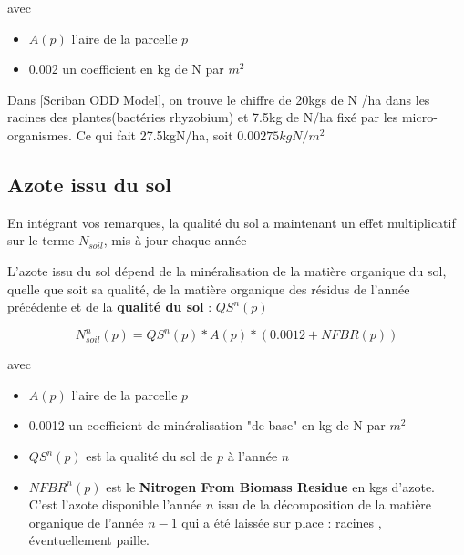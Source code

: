 \documentclass[10pt,a4paper,french]{article} %
\begin{document}
avec 
\begin{itemize}
  \item $A(p)$ l'aire de la parcelle $p$
  \item 0.002  un coefficient en kg de N par $m^2$
\end{itemize}

Dans [Scriban ODD Model], on trouve le chiffre de 20kgs de N /ha dans les racines des plantes(bactéries rhyzobium) et 7.5kg de N/ha  fixé par les micro-organismes. Ce qui fait 27.5kgN/ha, soit $0.00275 kgN/m^2$ 


\subsection{Azote issu du sol}






\begin{tcolorbox}[noparskip,
    colback=Orange,colframe=SandyBrown,%
    colbacklower=LimeGreen!75!PeachPuff,%
    title=Changement]
En intégrant vos remarques, la qualité du sol a maintenant un effet multiplicatif sur le terme $N_{soil}$, mis à jour chaque année \\
\end{tcolorbox}





L'azote issu du sol dépend de la minéralisation de la matière organique du sol, quelle que soit sa qualité, de la matière organique des résidus de l'année précédente et de la \textbf{qualité du sol} :  $QS^{n}(p)$

\begin{equation}
N^{n}_{soil}(p) = QS^n(p) * A(p) * ( 0.0012 + NFBR(p))
\end{equation}


avec 
\begin{itemize}
  \item $A(p)$ l'aire de la parcelle $p$
  \item 0.0012  un coefficient de minéralisation "de base" en kg de N par $m^2$
  \item $QS^{n}(p)$ est la qualité du sol de $p$ à l'année $n$
  \item $NFBR^n(p)$ est le \textbf{Nitrogen From Biomass Residue} en kgs d'azote. C'est l'azote disponible l'année $n$  issu de la décomposition de la matière organique de l’année $n-1$ qui a été laissée sur place : racines , éventuellement paille.

\end{itemize}
\end{document}
